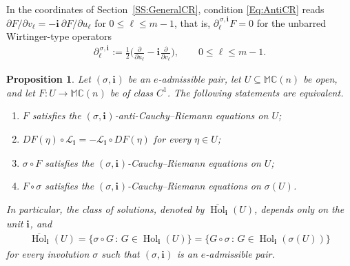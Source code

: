 \documentclass[12pt]{amsart}
\theoremstyle{plain}
\newtheorem{proposition}[theorem]{Proposition}
\theoremstyle{definition}
\numberwithin{equation}{section}
\newcommand{\im}[1]{\mathbf{ i_{#1}}}
\newcommand{\mC}{\mathbb{C}}
\newcommand{\mM}{\mathbb{M}}
\newcommand{\cL}{\mathcal{L}}
\DeclareMathOperator{\hol}{Hol}
\begin{document}
In the coordinates of Section~\ref{SS:GeneralCR}, condition \eqref{Eq:AntiCR} reads $\partial F / \partial v_\ell = - \im{}\, \partial F / \partial u_\ell$ for $0 \leq \ell \leq m - 1$, that is, $\partial_\ell^{\, \sigma , \im{}} F = 0$ for the unbarred Wirtinger-type operators
    \begin{align*}
    \partial_\ell^{\, \sigma , \im{}} := \frac{1}{2} \Big( \frac{\partial}{\partial u_\ell} - \im{} \frac{\partial}{\partial v_\ell} \Big) , \qquad 0 \leq \ell \leq m - 1.
    \end{align*}

    \begin{proposition}\label{P:AntiHolo}
    Let $(\sigma,\im{})$ be an $e$-admissible pair, let $U\subseteq\mM \mC(n)$ be open, and let $F:U\to\mM \mC(n)$ be of class $C^1$. The following statements are equivalent.
        \begin{enumerate}[label=(\roman*)]
        \item $F$ satisfies the $(\sigma , \im{})$-anti-Cauchy--Riemann equations on $U$;
        \item $DF (\eta ) \circ \cL_{\im{}} = - \cL_{\im{}} \circ DF (\eta )$ for every $\eta \in U$;
        \item $\sigma \circ F$ satisfies the $(\sigma , \im{})$-Cauchy--Riemann equations on $U$;
        \item $F \circ \sigma$ satisfies the $(\sigma , \im{})$-Cauchy--Riemann equations on $\sigma (U)$.
        \end{enumerate}
    In particular, the class of solutions, denoted by $\overline{\hol}_{\im{}} (U)$, depends only on the unit $\im{}$, and
        \begin{align*}
        \overline{\hol}_{\im{}} (U) = \{ \sigma \circ G\, :\, G \in \hol_{\im{}} (U) \} = \{ G \circ \sigma\, :\, G \in \hol_{\im{}} (\sigma (U)) \}
        \end{align*}
    for every involution $\sigma$ such that $(\sigma,\im{})$ is an $e$-admissible pair.
    \end{proposition}
\end{document}
